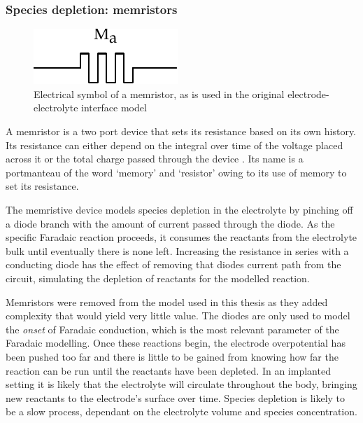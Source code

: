     \subsubsection{Species depletion: memristors}

      \begin{figure}[h]
        \centering
        \includegraphics{content/pt2/07-InterfaceModel/graphics/memristorSymbol}
        \caption{\label{fig:pt2-memristorSymbol}Electrical symbol of a memristor, as is used in the original electrode-electrolyte interface model}
      \end{figure}

      A memristor is a two port device that sets its resistance based on its own history.
      Its resistance can either depend on the integral over time of the voltage placed across it or the total charge passed through the device \cite{Kvatinsky2012}.
      Its name is a portmanteau of the word `memory' and `resistor' owing to its use of memory to set its resistance.

      The memristive device models species depletion in the electrolyte by pinching off a diode branch with the amount of current passed through the diode.
      As the specific Faradaic reaction proceeds, it consumes the reactants from the electrolyte bulk until eventually there is none left.
      Increasing the resistance in series with a conducting diode has the effect of removing that diodes current path from the circuit, simulating the depletion of reactants for the modelled reaction.

      Memristors were removed from the model used in this thesis as they added complexity that would yield very little value.
      The diodes are only used to model the \emph{onset} of Faradaic conduction, which is the most relevant parameter of the Faradaic modelling.
      Once these reactions begin, the electrode overpotential has been pushed too far and there is little to be gained from knowing how far the reaction can be run until the reactants have been depleted.
      In an implanted setting it is likely that the electrolyte will circulate throughout the body, bringing new reactants to the electrode's surface over time.
      Species depletion is likely to be a slow process, dependant on the electrolyte volume and species concentration.

